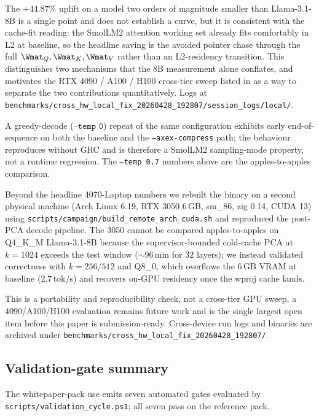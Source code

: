 \documentclass[11pt]{article}
\begin{document}
The $+44.87\%$ uplift on a model two orders of magnitude smaller than
Llama-3.1-8B is a single point and does not establish a curve, but it is
consistent with the cache-fit reading: the SmolLM2 attention working set
already fits comfortably in L2 at baseline, so the headline saving is
the avoided pointer chase through the full $\Wmat_Q,\Wmat_K,\Wmat_V$
rather than an L2-residency transition. This distinguishes two
mechanisms that the 8B measurement alone conflates, and motivates the
RTX 4090 / A100 / H100 cross-tier sweep listed in
 as a way to separate the two contributions
quantitatively. Logs at
\texttt{benchmarks/cross\_hw\_local\_fix\_20260428\_192807/session\_logs/local/}.

A greedy-decode ($\texttt{--temp 0}$) repeat of the same configuration
exhibits early end-of-sequence on both the baseline and the
\texttt{--axex-compress} path; the behaviour reproduces without GRC and
is therefore a SmolLM2 sampling-mode property, not a runtime regression.
The \texttt{--temp 0.7} numbers above are the apples-to-apples
comparison.

\label{sec:second-device}

Beyond the headline 4070-Laptop numbers we rebuilt the binary on a
second physical machine (Arch Linux 6.19, RTX 3050 6\,GB, sm\_86, zig
0.14, CUDA 13) using \texttt{scripts/campaign/build\_remote\_arch\_cuda.sh}
and reproduced the post-PCA decode pipeline. The 3050 cannot be compared
apples-to-apples on Q4\_K\_M Llama-3.1-8B because the supervisor-bounded
cold-cache PCA at $k{=}1024$ exceeds the test window ($\sim$96\,min for 32
layers); we instead validated correctness with $k{=}256/512$ and Q8\_0,
which overflows the 6\,GB VRAM at baseline (2.7\,tok/s) and recovers
on-GPU residency once the wproj cache lands.

This is a portability and reproducibility check, not a cross-tier
GPU sweep, a 4090/A100/H100 evaluation remains future work and is the
single largest open item before this paper is submission-ready.
Cross-device run logs and binaries are archived under
\texttt{benchmarks/cross\_hw\_local\_fix\_20260428\_192807/}.

\subsection{Validation-gate summary}

The whitepaper-pack use emits seven automated gates evaluated by
\texttt{scripts/validation\_cycle.ps1}; all seven pass on the reference pack.
\end{document}
